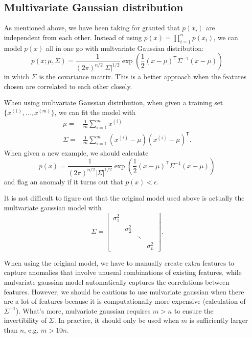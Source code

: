 \subsection{Multivariate Gaussian distribution}
As mentioned above, we have been taking for granted that $p(x_i)$ are independent from each other. Instead of using $p(x) = \prod\limits_{i=1}^{n}p(x_i)$, we can model $p(x)$ all in one go with multvariate Gaussian distribution:
\begin{equation}
p(x;\mu,\Sigma) = \frac{1}{(2\pi)^{n/2}\left\lvert\Sigma\right\rvert^{1/2}}\exp\left(\frac{1}{2}(x-\mu)^{\mathsf T}\Sigma^{-1}(x-\mu)\right)
\end{equation}
in which $\Sigma$ is the covariance matrix. This is a better approach when the features chosen are correlated to each other closely. 

When using multvariate Gaussian distribution, when given a training set $\{x^{(1)},\dots,x^{(m)}\}$, we can fit the model with 
\begin{equation}
\begin{split}
\mu=&\frac{1}{m}\sum\limits_{i=1}^mx^{(i)}\\
\Sigma=&\frac{1}{m}\sum\limits_{i=1}^m(x^{(i)}-\mu)(x^{(i)}-\mu)^{\mathsf T}.
\end{split}
\end{equation}
When given a new example, we should calculate
\begin{equation*}
p(x) = \frac{1}{(2\pi)^{n/2}\left\lvert\Sigma\right\rvert^{1/2}}\exp\left(\frac{1}{2}(x-\mu)^{\mathsf T}\Sigma^{-1}(x-\mu)\right)
\end{equation*}
and flag an anomaly if it turns out that $p(x) < \epsilon$.

It is not difficult to figure out that the original model used above is actually the multvariate gaussian model with 
\begin{equation}
\Sigma = \begin{bmatrix}
\sigma_1^2\\
&\sigma_2^2\\
&&\ddots\\
&&&\sigma_n^2
\end{bmatrix}.
\end{equation}

When using the original model, we have to manually create extra features to capture anomalies that involve unusual combinations of existing features, while mulvariate gaussian model automatically captures the correlations between features. However, we should be cautious to use mulvariate gaussian when there are a lot of features because it is computationally more expensive (calculation of $\Sigma^{-1}$). What's more, mulvariate gaussian requires $m>n$ to ensure the invertibility of $\Sigma$. In practice, it should only be used when $m$ is sufficiently larger than $n$, e.g. $m>10n$.
